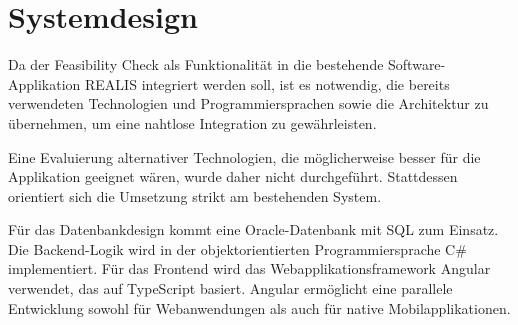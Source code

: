 \chapter{Systemdesign}

Da der Feasibility Check als Funktionalität in die bestehende Software-Applikation \gls{REALIS} integriert werden soll, ist es notwendig, die bereits verwendeten Technologien und Programmiersprachen sowie die Architektur zu übernehmen, um eine nahtlose Integration zu gewährleisten.

Eine Evaluierung alternativer Technologien, die möglicherweise besser für die Applikation geeignet wären, wurde daher nicht durchgeführt. Stattdessen orientiert sich die Umsetzung strikt am bestehenden System.

Für das Datenbankdesign kommt eine Oracle-Datenbank mit SQL zum Einsatz. Die Backend-Logik wird in der objektorientierten Programmiersprache C\# implementiert. Für das Frontend wird das Webapplikationsframework Angular verwendet, das auf TypeScript basiert. Angular ermöglicht eine parallele Entwicklung sowohl für Webanwendungen als auch für native Mobilapplikationen.








